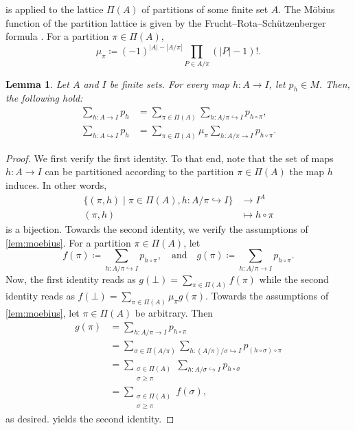 \documentclass[10pt,a4paper]{article}
\theoremstyle{definition}
\theoremstyle{plain}
\newtheorem{lemma}[definition]{Lemma}
\theoremstyle{remark}
\begin{document}
	 is applied to the lattice $\Pi(A)$ of partitions of some finite set $A$.
	The Möbius function of the partition lattice is given by 
	the Frucht--Rota--Schützenberger formula \cite[(A.2)]{lovasz_large_2012}.
	For a partition $\pi \in \Pi(A)$,
	\begin{equation}\label{eq:frs}
		\mu_{\pi} \coloneqq (-1)^{|A| - |A/\pi|} \prod_{ P \in A/\pi} (|P|-1)!.
	\end{equation}

	
	\begin{lemma} \label{lem:moebius-polynomial}
		Let $A$ and $I$ be finite sets. 
		For every map $h \colon A \to I$, let $p_h \in M$.
		Then, the following hold:
		\begin{align*}
			\sum_{h \colon A \to I} p_h &= \sum_{\pi \in \Pi(A)} \sum_{h \colon A/\pi \hookrightarrow I} p_{h \circ \pi}, \\
			\sum_{h \colon A \hookrightarrow I} p_h &= \sum_{\pi \in \Pi(A)} \mu_\pi \sum_{h \colon A/\pi \to I} p_{h \circ \pi}.
		\end{align*}
	\end{lemma}
	\begin{proof}
		We first verify the first identity.
		To that end, note that the set of maps $h \colon A \to I$ can be partitioned according to the partition $\pi \in \Pi(A)$ the map $h$ induces.
		In other words,
		\begin{align*}
			\{(\pi, h) \mid \pi \in \Pi(A), h \colon A/\pi \hookrightarrow I \} &\to I^A \\
			(\pi, h) & \mapsto h \circ \pi
		\end{align*}
		is a bijection.
		Towards the second identity, we verify the assumptions of \cref{lem:moebius}.
		For a partition $\pi \in \Pi(A)$,
		let
		\[
			f(\pi) \coloneqq \sum_{h \colon A/\pi \hookrightarrow I} p_{h \circ \pi}, \quad \text{and} \quad
			g(\pi) \coloneqq \sum_{h \colon A/\pi \to I} p_{h \circ \pi}.
		\]
		Now, the first identity reads as $g(\bot) = \sum_{\pi \in \Pi(A)} f(\pi)$
		while the second identity reads as $f(\bot) = \sum_{\pi \in \Pi(A)} \mu_\pi g(\pi)$.
		Towards the assumptions of \cref{lem:moebius}, let $\pi \in \Pi(A)$ be arbitrary.
		Then
		\begin{align*}
			g(\pi) &= \sum_{h \colon A/\pi \to I} p_{h \circ \pi} \\
				   &= \sum_{\sigma \in \Pi(A/\pi)} \sum_{h \colon (A/\pi)/\sigma \hookrightarrow I} p_{(h \circ \sigma) \circ \pi}  \\
				   &= \sum_{\substack{\sigma \in \Pi(A) \\ \sigma \geq \pi}} \sum_{h \colon A/\sigma \hookrightarrow I} p_{h \circ \sigma} \\
				   &= \sum_{\substack{\sigma \in \Pi(A) \\ \sigma \geq \pi}} f(\sigma),
		\end{align*}
		as desired.
		 yields the second identity.
	\end{proof}
	
\end{document}
